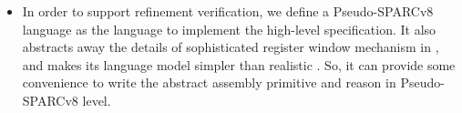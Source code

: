 \begin{itemize}



    \item
    In order to support refinement verification, we define a
    Pseudo-SPARCv8 language as the language to implement
    the high-level specification.
    It also abstracts away the details of 
    sophisticated register window mechanism
    in \sparc{}, and makes its language model 
    simpler than realistic \sparc{}. 
    So, it can provide some convenience
    to write the abstract assembly primitive
    and reason in Pseudo-SPARCv8 level.


\end{itemize}
